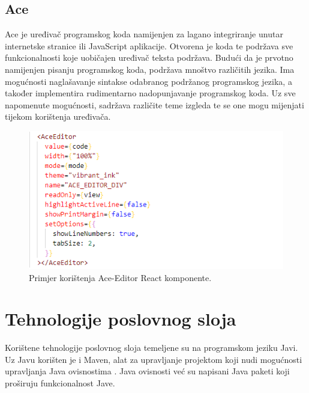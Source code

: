 \documentclass[times, utf8, zavrsni]{fer}
\begin{document}
			\subsection{Ace}
			Ace je uređivač programskog koda namijenjen za lagano integriranje unutar internetske stranice ili JavaScript aplikacije. Otvorena je koda te podržava sve funkcionalnosti koje uobičajen uređivač teksta podržava. Budući da je prvotno namijenjen pisanju programskog koda, podržava mnoštvo različitih jezika. Ima mogućnosti naglašavanje sintakse odabranog podržanog programskog jezika, a također implementira rudimentarno nadopunjavanje programskog koda. Uz sve napomenute mogućnosti, sadržava različite teme izgleda te se one mogu mijenjati tijekom korištenja uređivača.
			\begin{figure}[H]
				\centering
				\includegraphics[width=\linewidth]{pictures/prikazi/AceEditor.png}
				\caption{Primjer korištenja Ace-Editor React komponente.}
				\label{fig:ace}
			\end{figure}
	
		\section{Tehnologije poslovnog sloja}
		Korištene tehnologije poslovnog sloja temeljene su na programskom jeziku Javi. Uz Javu korišten je i Maven, alat za upravljanje projektom koji nudi mogućnosti upravljanja Java ovisnostima . Java ovisnosti već su napisani Java paketi koji proširuju funkcionalnost Jave.
\end{document}
